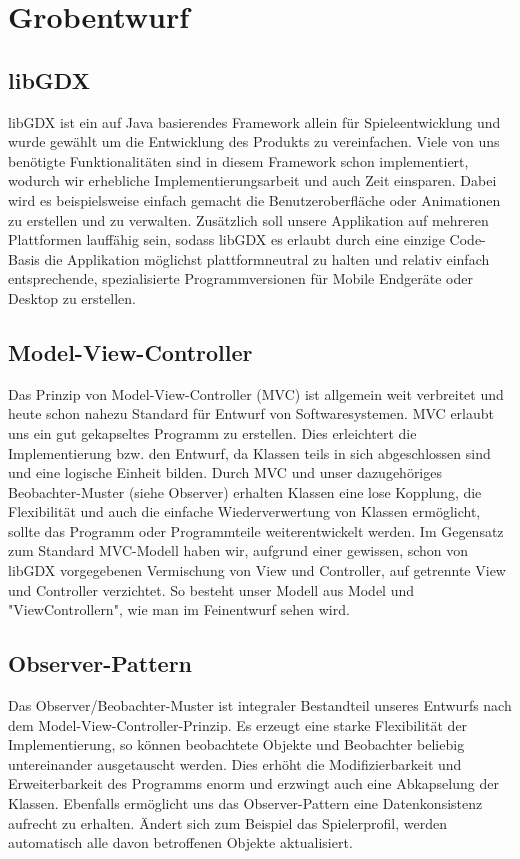 \section{Grobentwurf}

\subsection{libGDX}
libGDX ist ein auf Java basierendes Framework allein für Spieleentwicklung und wurde gewählt um die Entwicklung des Produkts zu vereinfachen.
Viele von uns benötigte Funktionalitäten sind in diesem Framework schon implementiert, wodurch wir erhebliche Implementierungsarbeit und auch Zeit einsparen.
Dabei wird es beispielsweise einfach gemacht die Benutzeroberfläche oder Animationen zu erstellen und zu verwalten.
Zusätzlich soll unsere Applikation auf mehreren Plattformen lauffähig sein, sodass libGDX es erlaubt durch eine einzige Code-Basis die Applikation möglichst plattformneutral zu halten 
und relativ einfach entsprechende, spezialisierte Programmversionen für Mobile Endgeräte oder Desktop zu erstellen.

\subsection{Model-View-Controller}
Das Prinzip von Model-View-Controller (MVC) ist allgemein weit verbreitet und heute schon nahezu Standard für Entwurf von Softwaresystemen. 
MVC erlaubt uns ein gut gekapseltes Programm zu erstellen. Dies erleichtert die Implementierung bzw. den Entwurf, da Klassen teils in sich abgeschlossen sind
und eine logische Einheit bilden. Durch MVC und unser dazugehöriges Beobachter-Muster (siehe Observer) erhalten Klassen eine lose Kopplung,
die Flexibilität und auch die einfache Wiederverwertung von Klassen ermöglicht, sollte das Programm oder Programmteile weiterentwickelt werden.
Im Gegensatz zum Standard MVC-Modell haben wir, aufgrund einer gewissen, schon von libGDX vorgegebenen Vermischung von View und Controller,
auf getrennte View und Controller verzichtet. So besteht unser Modell aus Model und "ViewControllern", wie man im Feinentwurf sehen wird.

\subsection{Observer-Pattern}
Das Observer/Beobachter-Muster ist integraler Bestandteil unseres Entwurfs nach dem Model-View-Controller-Prinzip.
Es erzeugt eine starke Flexibilität der Implementierung, so können beobachtete Objekte und Beobachter beliebig untereinander ausgetauscht werden.
Dies erhöht die Modifizierbarkeit und Erweiterbarkeit des Programms enorm und erzwingt auch eine Abkapselung der Klassen.
Ebenfalls ermöglicht uns das Observer-Pattern eine Datenkonsistenz aufrecht zu erhalten. Ändert sich zum Beispiel das Spielerprofil, 
werden automatisch alle davon betroffenen Objekte aktualisiert.

